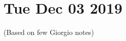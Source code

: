 \documentclass[main.tex]{subfiles}
\begin{document}
\section*{Tue Dec 03 2019}

(Based on few Giorgio notes)
\end{document}
